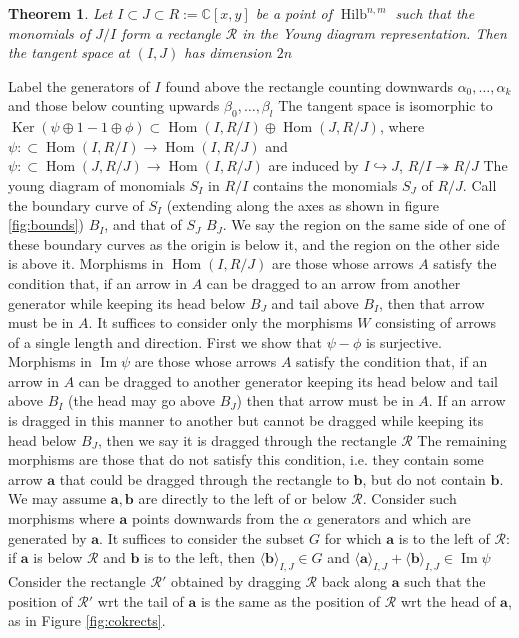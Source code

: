 \documentclass[a4page]{article}
\def\Ker{\operatorname{Ker}}
\def\Hilb{\operatorname{Hilb}}
\def\Hom{\operatorname{Hom}}
\newtheorem{theorem}{Theorem}[section]
\theoremstyle{definition}
\newcommand{\R}{\mathcal{R}}
\newcommand{\C}{\mathbb{C}}
\DeclareMathOperator{\im}{Im}
\begin{document}
\begin{theorem} Let $I \subset J \subset R := \C[x,y]$ be a point of $\Hilb^{n,m}$ such that the monomials of $J/I$ form a rectangle $\R$ in the Young diagram representation. Then the tangent space at $(I,J)$ has dimension $2n$
\end{theorem}
Label the generators of $I$ found above the rectangle counting downwards $\alpha_0, \dots, \alpha_k$ and those below counting upwards $\beta_0, \dots, \beta_l$
The tangent space is isomorphic to $\Ker (\psi \oplus 1 - 1 \oplus \phi) \subset \Hom(I,R/I)\oplus \Hom(J,R/J)$, where $\psi : \subset \Hom(I,R/I) \to \Hom(I,R/J)$ and $\psi : \subset \Hom(J,R/J) \to \Hom(I,R/J)$
are induced by $I \hookrightarrow J$, $R/I \twoheadrightarrow R/J$
The young diagram of monomials $S_I$ in $R/I$ contains the monomials $S_J$ of $R/J$. Call the boundary curve of $S_I$ (extending along the axes as shown in figure \ref{fig:bounds}) $B_I$, and that of $S_J$ $B_J$.
We say the region on the same side of one of these boundary curves as the origin is below it, and the region on the other side is above it.
Morphisms in $\Hom(I,R/J)$ are those whose arrows $A$ satisfy the condition that, if an arrow in $A$ can be dragged to an arrow from another generator while keeping its head below $B_J$ and tail above $B_I$,
then that arrow must be in $A$.
It suffices to consider only the morphisms $W$ consisting of arrows of a single length and direction.
First we show that $\psi-\phi$ is surjective. Morphisms in $\im \psi$ are those whose arrows $A$ satisfy the condition that,
if an arrow in $A$ can be dragged to another generator keeping its head below and tail above $B_I$ (the head may go above $B_J$) then that arrow must be in $A$.
If an arrow is dragged in this manner to another but cannot be dragged while keeping its head below $B_J$, then we say it is dragged through the rectangle $\R$
The remaining morphisms are those that do not satisfy this condition, i.e. they contain some arrow $\mathbf a$ that could be dragged through the rectangle to $\mathbf b$, but do not contain $\mathbf b$.
We may assume $\mathbf a, \mathbf b$ are directly to the left of or below $\R$.
Consider such morphisms where $\mathbf a$ points downwards from the $\alpha$ generators and which are generated by $\mathbf a$. It suffices to consider the subset $G$ for which $\mathbf a$ is to the left of $\R$:
if $\mathbf a$ is below $\R$ and $\mathbf b$ is to the left, then $\langle\mathbf b\rangle_{I,J} \in G$ and $\langle\mathbf a\rangle_{I,J}+\langle\mathbf b\rangle_{I,J} \in \im \psi$
Consider the rectangle $\R'$ obtained by dragging $\R$ back along $\mathbf a$ such that the position of $\R'$ wrt the tail of $\mathbf a$ is the same as the position of $\R$ wrt the head of $\mathbf a$, as in Figure \ref{fig:cokrects}.
\end{document}
